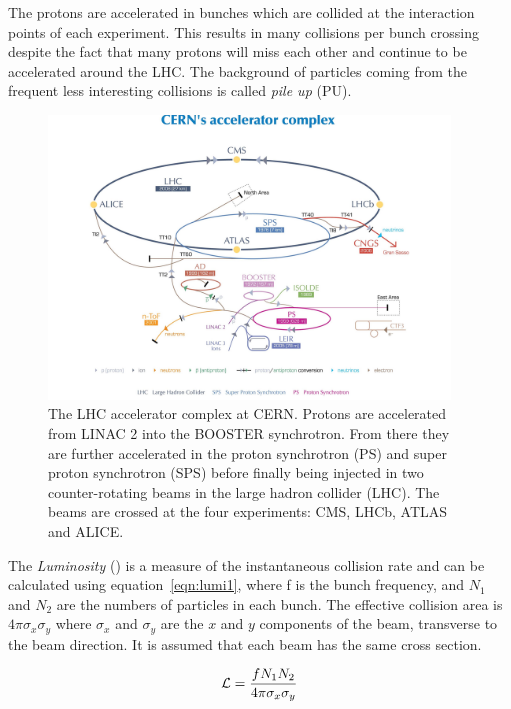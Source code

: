 The protons are accelerated in bunches which are collided at the interaction points of each experiment. This results in many collisions per bunch crossing despite the fact that many protons will miss each other and continue to be accelerated around the LHC. The background of particles coming from the frequent less interesting collisions is called \emph{pile up} (PU).

\begin{figure}[ht!]
\centering
    \includegraphics[width=0.95\textwidth]{images/LHCacc.jpg}
    \caption{The LHC accelerator complex at CERN. Protons are accelerated from LINAC 2 into the BOOSTER synchrotron. From there they are further accelerated in the proton synchrotron (PS) and super proton synchrotron (SPS) before finally being injected in two counter-rotating beams in the large hadron collider (LHC). The beams are crossed at the four experiments: CMS, LHCb, ATLAS and ALICE.}
    \label{fig:LHC acc}
\end{figure}


The \emph{Luminosity} (\lumi) is a measure of the instantaneous collision rate and can be calculated using equation~\ref{eqn:lumi1}, where f is the bunch frequency, and $N_1$ and $N_2$ are the numbers of particles in each bunch. The effective collision area is $4\pi\sigma_{x}\sigma_{y}$ where $\sigma_{x}$ and $\sigma_{y}$ are the $x$ and $y$ components of the beam, transverse to the beam direction. It is assumed that each beam has the same cross section.

\begin{equation}
\mathcal{L} = \frac{f{N}_{1}{N}_{2}}{4\pi\sigma_{x}\sigma_{y}}
\label{eqn:lumi1}
\end{equation}


